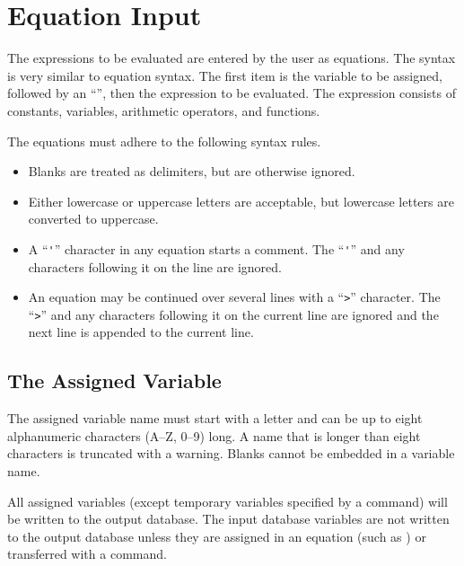 \chapter{Equation Input} \label{chap:equation}

The expressions to be evaluated are entered by the user as equations.
The syntax is very similar to  equation syntax. The first
item is the variable to be assigned, followed by an ``\cmd{=}'', then
the expression to be evaluated. The expression consists of constants,
variables, arithmetic operators, and functions.

The equations must adhere to the following syntax rules.
\setlength{\itemsep}{\medskipamount} \begin{itemize}
\item
Blanks are treated as delimiters, but are otherwise ignored.
\item
Either lowercase or uppercase letters are acceptable, but lowercase
letters are converted to uppercase.
\item
A ``\verb|'|'' character in any equation starts a comment. The
``\verb|'|'' and any characters following it on the line are ignored.
\item
An equation may be continued over several lines with a ``\verb|>|''
character. The ``\verb|>|'' and any characters following it on the
current line are ignored and the next line is appended to the current
line.
\end{itemize}

\section{The Assigned Variable} \label{assvar}

The assigned variable name must start with a letter and can be up to
eight alphanumeric characters (A--Z, 0--9) long. A name that is longer
than eight characters is truncated with a warning. Blanks cannot be
embedded in a variable name.

All assigned variables (except temporary variables specified by a
 command) will be written to the output database. The input
database variables are not written to the output database unless they
are assigned in an equation (such as ) or transferred with a
 command.

